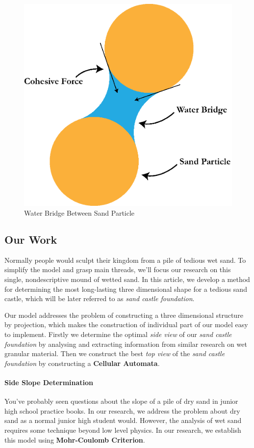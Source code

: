 \documentclass[12pt]{article}
\begin{document}
\begin{figure}
    \centering
    \includegraphics[width=0.5\linewidth]{water_bridge.eps}
    \caption{Water Bridge Between Sand Particle}
    \label{fig:water_bridge}
\end{figure}

\subsection{Our Work}
Normally people would sculpt their kingdom from a pile of tedious wet sand. To simplify the model and grasp main threads, we'll focus our research on this single, nondescriptive mound of wetted sand. In this article, we develop a method for determining the most long-lasting three dimensional shape for a tedious sand castle, which will be later referred to as \textit{sand castle foundation}.
\par
Our model addresses the problem of constructing a three dimensional structure by projection, which makes the construction of individual part of our model easy to implement. Firstly we determine the optimal \textit{side view} of our \textit{sand castle foundation} by analysing and extracting information from similar research on wet granular material\autocite{mitarai2006wet}. Then we construct the best \textit{top view} of the \textit{sand castle foundation} by constructing a \textbf{Cellular Automata}.

\paragraph{Side Slope Determination}
You've probably seen questions about the slope of a pile of dry sand in junior high school practice books. In our research, we address the problem about dry sand as a normal junior high student would. However, the analysis of wet sand requires some technique beyond low level physics. In our research, we establish this model using \textbf{Mohr-Coulomb Criterion}.
\end{document}
